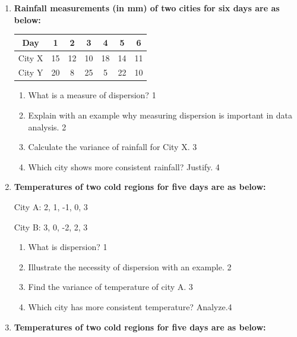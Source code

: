 \documentclass[a4paper,oneside]{book}
\begin{document}
\begin{enumerate}

\item
\textbf{Rainfall measurements (in mm) of two cities for six days are as below:}

\begin{table}[h]
\centering
\begin{tabular}{c|cccccc}
Day & 1 & 2 & 3 & 4 & 5 & 6 \\
\hline
City X & 15 & 12 & 10 & 18 & 14 & 11 \\ \hline
City Y & 20 & 8 & 25 & 5 & 22 & 10 \\
\end{tabular}
\end{table}

\begin{enumerate}
    \item
    What is a measure of dispersion? \hfill 1
    
    \item
    Explain with an example why measuring dispersion is important in data analysis. \hfill 2
    
    \item
    Calculate the variance of rainfall for City X. \hfill 3
    
    \item
    Which city shows more consistent rainfall? Justify. \hfill 4
\end{enumerate}

    \item
  \textbf{Temperatures of two cold regions for five days are as below:}

    \begin{center}

    City A: 2, 1, -1, 0, 3

    City B: 3, 0, -2, 2, 3
    
    \end{center}
  \begin{enumerate}
    \item
	What is dispersion? \hfill 1
    \item
	Illustrate the necessity of dispersion with an example. \hfill 2
    \item  
	Find the variance of temperature of city A.  \hfill 3
    \item
	Which city has more consistent temperature? Analyze.\hfill 4
\end{enumerate}

    \item
  \textbf{Temperatures of two cold regions for five days are as below:}


\end{enumerate}
\end{document}
